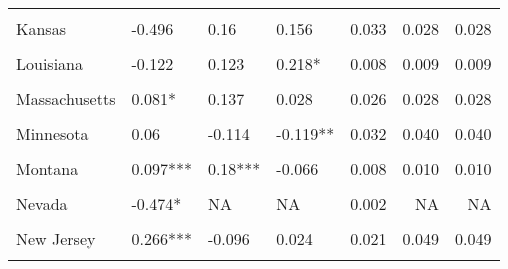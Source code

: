 \begin{table}[!h]
\begin{tabular}[t]{llllrrr}
\cellcolor{gray!10}{Indiana} & \cellcolor{gray!10}{0.071***} & \cellcolor{gray!10}{-0.001} & \cellcolor{gray!10}{0.04} & \cellcolor{gray!10}{0.034} & \cellcolor{gray!10}{0.039} & \cellcolor{gray!10}{0.039}\\
Kansas & -0.496 & 0.16 & 0.156 & 0.033 & 0.028 & 0.028\\
\cellcolor{gray!10}{Kentucky} & \cellcolor{gray!10}{0.096***} & \cellcolor{gray!10}{0.009} & \cellcolor{gray!10}{0.022} & \cellcolor{gray!10}{0.017} & \cellcolor{gray!10}{0.022} & \cellcolor{gray!10}{0.022}\\
Louisiana & -0.122 & 0.123 & 0.218* & 0.008 & 0.009 & 0.009\\
\cellcolor{gray!10}{Maine} & \cellcolor{gray!10}{0.081***} & \cellcolor{gray!10}{NA} & \cellcolor{gray!10}{NA} & \cellcolor{gray!10}{0.012} & \cellcolor{gray!10}{NA} & \cellcolor{gray!10}{NA}\\
Massachusetts & 0.081* & 0.137 & 0.028 & 0.026 & 0.028 & 0.028\\
\cellcolor{gray!10}{Michigan} & \cellcolor{gray!10}{-0.028} & \cellcolor{gray!10}{0.082} & \cellcolor{gray!10}{0.129*} & \cellcolor{gray!10}{0.060} & \cellcolor{gray!10}{0.065} & \cellcolor{gray!10}{0.065}\\
Minnesota & 0.06 & -0.114 & -0.119** & 0.032 & 0.040 & 0.040\\
\cellcolor{gray!10}{Mississippi} & \cellcolor{gray!10}{0.184***} & \cellcolor{gray!10}{-0.068} & \cellcolor{gray!10}{0.032} & \cellcolor{gray!10}{0.012} & \cellcolor{gray!10}{0.016} & \cellcolor{gray!10}{0.016}\\
Montana & 0.097*** & 0.18*** & -0.066 & 0.008 & 0.010 & 0.010\\
\cellcolor{gray!10}{Nebraska} & \cellcolor{gray!10}{0.115***} & \cellcolor{gray!10}{-0.081} & \cellcolor{gray!10}{-0.147} & \cellcolor{gray!10}{0.026} & \cellcolor{gray!10}{0.018} & \cellcolor{gray!10}{0.018}\\
Nevada & -0.474* & NA & NA & 0.002 & NA & NA\\
\cellcolor{gray!10}{New Hampshire} & \cellcolor{gray!10}{0.08} & \cellcolor{gray!10}{-0.017} & \cellcolor{gray!10}{0.045} & \cellcolor{gray!10}{0.007} & \cellcolor{gray!10}{0.011} & \cellcolor{gray!10}{0.011}\\
New Jersey & 0.266*** & -0.096 & 0.024 & 0.021 & 0.049 & 0.049\\
\cellcolor{gray!10}{New Mexico} & \cellcolor{gray!10}{-0.06} & \cellcolor{gray!10}{0.07} & \cellcolor{gray!10}{-0.286} & \cellcolor{gray!10}{0.010} & \cellcolor{gray!10}{0.007} & \cellcolor{gray!10}{0.007}\\

\end{tabular}
\end{table}
